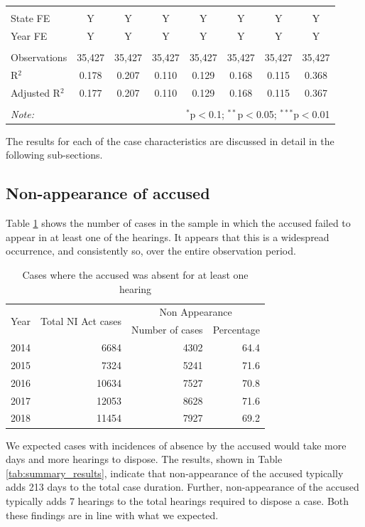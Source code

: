 \documentclass[12pt,a4paper]{article}
\begin{document}
{\begin{longtable}{lccccccc}
 \hline \\[-1.8ex]
 State FE & Y & Y & Y & Y & Y & Y & Y \\ 
 Year FE & Y & Y & Y & Y & Y & Y & Y \\ 
 \hline \\[-1.8ex] 
 Observations & 35,427 & 35,427 & 35,427 & 35,427 & 35,427 & 35,427 & 35,427 \\ 
 R$^{2}$ & 0.178 & 0.207 & 0.110 & 0.129 & 0.168 & 0.115 & 0.368 \\ 
 Adjusted R$^{2}$ & 0.177 & 0.207 & 0.110 & 0.129 & 0.168 & 0.115 & 0.367 \\ 
 \hline \\[-1.8ex] 
 \textit{Note:} & \multicolumn{7}{r}{$^{*}$p$<$0.1; $^{**}$p$<$0.05; $^{***}$p$<$0.01} \\ 
\end{longtable}}

The results for each of the case characteristics are discussed in detail in the following sub-sections.

\subsection{Non-appearance of accused}
\label{sec:non-appe-accus-1}

Table \ref{tab:nonAppearance_yearWise} shows the number of cases in the sample in which the accused failed to appear in at least one of the hearings. It appears that this is a widespread occurrence, and consistently so, over the entire observation period.

\begin{longtable}{@{}lrrr@{}}
 \caption{Cases where the accused was absent for at least one hearing}\label{tab:nonAppearance_yearWise}\\
\toprule
\multirow{2}{*}{Year} & \multirow{2}{*}{Total NI Act cases} & \multicolumn{2}{c}{Non Appearance}\\
\cmidrule{3-4}
&& Number of cases & Percentage \\
\midrule\endhead
2014 & 6684 & 4302 & 64.4 \\
2015 & 7324 & 5241 & 71.6 \\
2016 & 10634 & 7527 & 70.8 \\
2017 & 12053 & 8628 & 71.6 \\
2018 & 11454 & 7927 & 69.2 \\
\bottomrule
\end{longtable}

We expected cases with incidences of absence by the accused would take more days and more hearings to dispose. The results, shown in Table \ref{tab:summary_results}, indicate that non-appearance of the accused typically adds 213 days to the total case duration. Further, non-appearance of the accused typically adds 7 hearings to the total hearings required to dispose a case. Both these findings are in line with what we expected.
\end{document}
